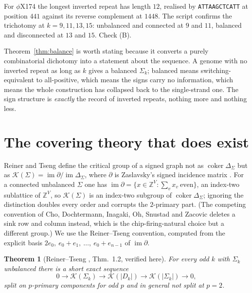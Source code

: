 \documentclass[11pt]{article}
\theoremstyle{plain}
\newtheorem{theorem}{Theorem}
\theoremstyle{definition}
\theoremstyle{remark}
\newcommand{\Z}{\mathbb{Z}}
\newcommand{\K}{\mathcal{K}}
\newcommand{\coker}{\operatorname{coker}}
\newcommand{\im}{\operatorname{im}}
\newcommand{\Sig}{\Sigma}
\begin{document}
For $\phi$X174 the longest inverted repeat has length $12$, realised by
\texttt{ATTAAGCTCATT} at position $441$ against its reverse complement at $1448$. The script
confirms the trichotomy at $k=9,11,13,15$: unbalanced and connected at $9$ and $11$,
balanced and disconnected at $13$ and $15$. Check (B).

Theorem~\ref{thm:balance} is worth stating because it converts a purely combinatorial
dichotomy into a statement about the sequence. A genome with no inverted repeat as long as
$k$ gives a balanced $\Sig_k$; balanced means switching-equivalent to all-positive, which
means the signs carry no information, which means the whole construction has collapsed back
to the single-strand one. The sign structure is \emph{exactly} the record of inverted
repeats, nothing more and nothing less.

\section{The covering theory that does exist}\label{sec:rt}

Reiner and Tseng define the critical group of a signed graph not as $\coker\Delta_\Sig$ but
as $\K(\Sig)=\im\partial/\im\Delta_\Sig$, where $\partial$ is Zaslavsky's signed incidence
matrix \cite[eq.~(1.3), \S9]{RT14}. For a connected unbalanced $\Sig$ one has
$\im\partial=\{x\in\Z^V:\sum_v x_v\ \text{even}\}$, an index-two sublattice of $\Z^V$, so
$\K(\Sig)$ is an index-two subgroup of $\coker\Delta_\Sig$; ignoring the distinction doubles
every order and corrupts the $2$-primary part. (The competing convention of Cho, Dochtermann,
Inagaki, Oh, Snustad and Zacovic \cite{CDIOSZ} deletes a sink row and column instead, which
is the chip-firing-natural choice but a different group.) We use the Reiner--Tseng
convention, computed from the explicit basis $2e_0,\ e_0+e_1,\ \dots,\ e_0+e_{n-1}$ of
$\im\partial$.

\begin{theorem}[Reiner--Tseng \cite{RT14}, Thm.~1.2, verified here]\label{thm:rt}
For every odd $k$ with $\Sig_k$ unbalanced there is a short exact sequence
\[
  0\longrightarrow \K(\Sig_k)\longrightarrow \K(|D_k|)\longrightarrow \K(|\Sig_k|)
  \longrightarrow 0 ,
\]
split on $p$-primary components for odd $p$ and in general \emph{not} split at $p=2$.
\end{theorem}
\end{document}
